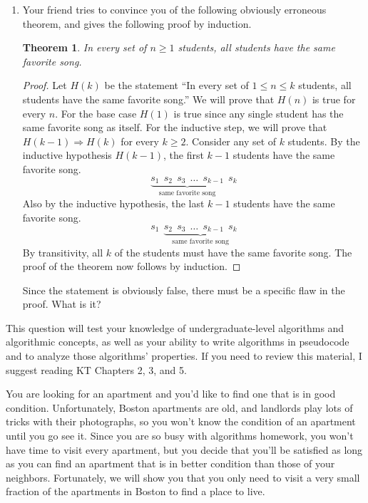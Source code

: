 \documentclass[11pt]{article}
\newtheorem{thm}{Theorem}
\theoremstyle{definition}
\begin{document}
\begin{enumerate}[leftmargin=0pt, itemsep=3ex]
\begin{enumerate}[leftmargin=0pt, itemsep=3ex]
        \item Your friend tries to convince you of the following obviously erroneous theorem, and gives the following proof by induction.
        \begin{thm}
            In every set of $n \geq 1$ students, all students have the same favorite song.
        \end{thm}
        \begin{proof}
            Let $H(k)$ be the statement ``In every set of $1 \leq n \leq k$ students, all students have the same favorite song.''  We will prove that $H(n)$ is true for every $n$.  For the base case $H(1)$ is true since any single student has the same favorite song as itself.  For the inductive step, we will prove that $H(k-1) \Longrightarrow H(k)$ for every $k \geq 2$.  Consider any set of $k$ students.  By the inductive hypothesis $H(k-1)$, the first $k-1$ students have the same favorite song.
            \begin{equation*}
                \underbrace{s_1~~s_2~~s_3~~\dots~~s_{k-1}}_{\text{same favorite song}}~~s_{k}
            \end{equation*}
            Also by the inductive hypothesis, the last $k-1$ students have the same favorite song.
            \begin{equation*}
                s_1~~\underbrace{s_2~~s_3~~\dots~~s_{k-1}~~s_{k}}_{\text{same favorite song}}
            \end{equation*}
            By transitivity, all $k$ of the students must have the same favorite song.  The proof of the theorem now follows by induction.
        \end{proof}
        Since the statement is obviously false, there must be a specific flaw in the proof.  What is it?
    \end{enumerate}
    
    \problemitem This question will test your knowledge of undergraduate-level algorithms and algorithmic concepts, as well as your ability to write algorithms in pseudocode and to analyze those algorithms' properties.  If you need to review this material, I suggest reading KT Chapters 2, 3, and 5.

    You are looking for an apartment and you'd like to find one that is in good condition.  Unfortunately, Boston apartments are old, and landlords play lots of tricks with their photographs, so you won't know the condition of an apartment until you go see it.  Since you are so busy with algorithms homework, you won't have time to visit every apartment, but you decide that you'll be satisfied as long as you can find an apartment that is in better condition than those of your neighbors.  Fortunately, we will show you that you only need to visit a very small fraction of the apartments in Boston to find a place to live.
    

\end{enumerate}
\end{document}
